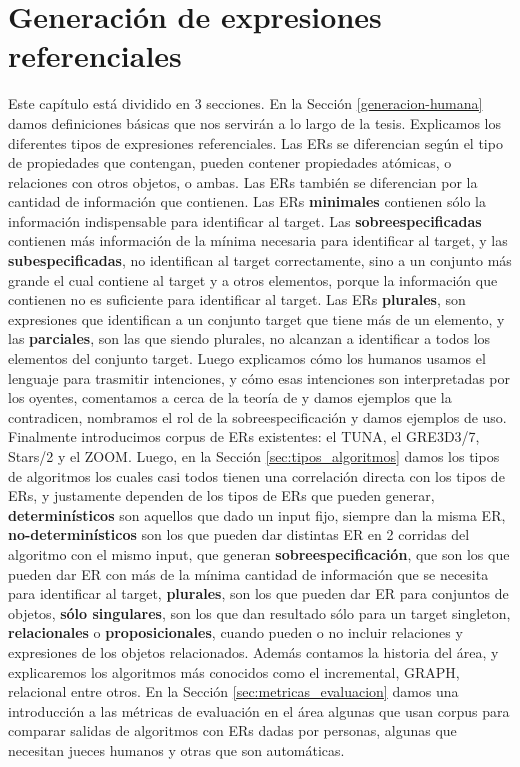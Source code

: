 \chapter{Generaci\'on de expresiones referenciales}
\label{sec:seleccion}

Este cap\'itulo est\'a dividido en 3 secciones. En la Secci\'on \ref{generacion-humana} damos definiciones b\'asicas que nos servir\'an a 
lo largo de la tesis. Explicamos los diferentes tipos de expresiones referenciales. Las ERs se diferencian seg\'un el tipo de propiedades que 
contengan, pueden contener propiedades at\'omicas, o relaciones con otros objetos, o ambas. Las ERs tambi\'en se diferencian por la cantidad 
de informaci\'on que contienen. Las ERs \textbf{minimales} contienen s\'olo la informaci\'on indispensable para identificar al target. Las \textbf{sobreespecificadas} contienen m\'as informaci\'on de la m\'inima necesaria para identificar al target, y las \textbf{subespecificadas}, no identifican al target correctamente, sino a un conjunto m\'as grande el cual contiene al target y a otros elementos, porque la informaci\'on que contienen no es suficiente para identificar al target. Las ERs \textbf{plurales}, son expresiones que identifican a un conjunto target que tiene m\'as de un elemento, y las \textbf{parciales}, son las que siendo plurales, no alcanzan a identificar a todos los elementos del conjunto target. Luego explicamos c\'omo los humanos usamos el lenguaje para trasmitir intenciones, y c\'omo esas intenciones son interpretadas por los oyentes, comentamos a cerca de la teor\'ia de \cite{Clark-Marshall81,clark1992arenas} y damos ejemplos que la contradicen, nombramos el rol de la sobreespecificaci\'on y damos ejemplos de uso. Finalmente introducimos corpus de ERs existentes: el TUNA, el GRE3D3/7, Stars/2 y el ZOOM.
Luego, en la Secci\'on \ref{sec:tipos_algoritmos} damos los tipos de algoritmos los cuales casi todos tienen una correlaci\'on directa con los tipos de ERs, y justamente dependen de los tipos de ERs que pueden generar, \textbf{determin\'isticos} son aquellos que dado un input fijo, siempre dan la misma ER, \textbf{no-determin\'isticos} son los que pueden dar distintas ER en 2 corridas del algoritmo con el mismo input, que generan \textbf{sobreespecificaci\'on}, que son los que pueden dar ER con m\'as de la m\'inima cantidad de informaci\'on que se necesita para identificar al target, \textbf{plurales}, son los que pueden dar ER para conjuntos de objetos, \textbf{s\'olo singulares}, son los que dan resultado s\'olo para un target singleton, \textbf{relacionales} o \textbf{proposicionales}, cuando pueden o no incluir relaciones y expresiones de los objetos relacionados. Adem\'as contamos la historia del \'area, y explicaremos los algoritmos m\'as conocidos como el incremental, GRAPH, relacional entre otros. 
En la Secci\'on \ref{sec:metricas_evaluacion} damos una introducci\'on a las m\'etricas de evaluaci\'on en el \'area algunas que usan corpus para comparar salidas de algoritmos con ERs dadas por personas, algunas que necesitan jueces humanos y otras que son autom\'aticas.



